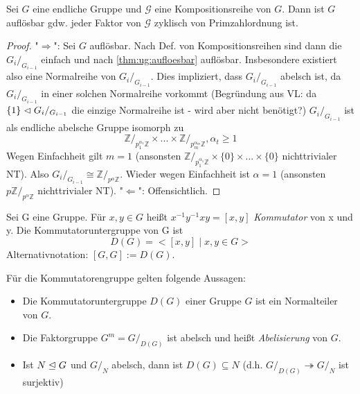 \documentclass[../main.tex]{subfiles}
\begin{document}
\begin{theorem}\label{theo:1.13}
    Sei $G$ eine endliche Gruppe und $\mathcal{G}$ eine Kompositionsreihe von $G$. Dann ist $G$ auflösbar gdw. jeder Faktor von $\mathcal{G}$ zyklisch von Primzahlordnung ist.
\end{theorem}
\begin{proof}
    "$\Rightarrow$": Sei $G$ auflösbar. Nach Def. von Kompositionsreihen sind dann die $G_i/_{G_{i-1}}$ einfach und nach \cref{thm:ug:aufloesbar} auflösbar. Insbesondere existiert also eine Normalreihe von  $G_i/_{G_{i-1}}$. Dies impliziert, dass $G_i/_{G_{i-1}}$ abelsch ist, da $G_i/_{G_{i-1}}$ in einer solchen Normalreihe vorkommt (Begründung aus VL: da  $\{1\} \vartriangleleft G_i/_{G_{i-1}}$ die einzige Normalreihe ist - wird aber nicht benötigt?)
    $G_i/_{G_{i-1}}$ ist als endliche abelsche Gruppe isomorph zu
    $$\mathbb{Z}/_{p_1^{\alpha_1}\mathbb{Z}} \times ... \times \mathbb{Z}/_{p_m^{\alpha_m}\mathbb{Z}}, \alpha_t \geq 1$$
    Wegen Einfachheit gilt $m = 1$ (ansonsten $\mathbb{Z}/_{p_1^{\alpha_1}\mathbb{Z}} \times \{0\} \times ... \times \{0\}$ nichttrivialer NT). Also $G_i/_{G_{i-1}} \cong \mathbb{Z}/_{p^\alpha\mathbb{Z}}$. Wieder wegen Einfachheit ist $\alpha = 1$ (ansonsten $p \mathbb{Z}/_{p^\alpha\mathbb{Z}}$ nichttrivialer NT).
    "$\Leftarrow$": Offensichtlich.
\end{proof}
\begin{definition}[Kommutator]
    Sei G eine Gruppe. Für $x,y \in G$ heißt $x^{-1}y^{-1}xy = [x,y]$ \emph{Kommutator} von x und y. Die Kommutatoruntergruppe von G ist $$D(G) = <[x,y] \mid x,y \in G>$$
    Alternativnotation: $[G,G] := D(G)$.
\end{definition}
\begin{lemma}[Abelisierung]
Für die Kommutatorengruppe gelten folgende Aussagen:
\begin{itemize}
    \item Die Kommutatoruntergruppe $D(G)$ einer Gruppe $G$ ist ein Normalteiler von $G$.
    \item Die Faktorgruppe $G^m = G/_{D(G)}$ ist abelsch und heißt \emph{Abelisierung} von $G$.
    \item Ist $N \trianglelefteq G$ und $G/_N$ abelsch, dann ist $D(G) \subseteq N$ (d.h. $G/_{D(G)} \twoheadrightarrow G/_N$ ist surjektiv)
\end{itemize}
\end{lemma}
\end{document}
